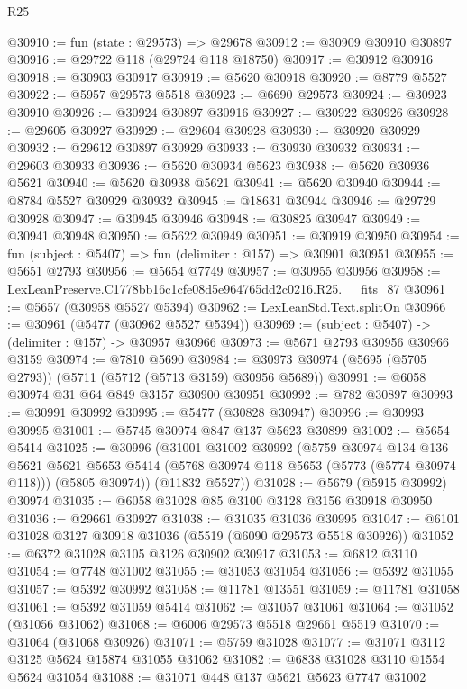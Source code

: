 \begin{lexlean}{R25}
\begin{coremodule}
@30910 := fun (state : @29573) => @29678
@30912 := @30909 @30910 @30897
@30916 := @29722 @118 (@29724 @118 @18750)
@30917 := @30912 @30916
@30918 := @30903 @30917
@30919 := @5620 @30918
@30920 := @8779 @5527
@30922 := @5957 @29573 @5518
@30923 := @6690 @29573
@30924 := @30923 @30910
@30926 := @30924 @30897 @30916
@30927 := @30922 @30926
@30928 := @29605 @30927
@30929 := @29604 @30928
@30930 := @30920 @30929
@30932 := @29612 @30897 @30929
@30933 := @30930 @30932
@30934 := @29603 @30933
@30936 := @5620 @30934 @5623
@30938 := @5620 @30936 @5621
@30940 := @5620 @30938 @5621
@30941 := @5620 @30940
@30944 := @8784 @5527 @30929 @30932
@30945 := @18631 @30944
@30946 := @29729 @30928
@30947 := @30945 @30946
@30948 := @30825 @30947
@30949 := @30941 @30948
@30950 := @5622 @30949
@30951 := @30919 @30950
@30954 := fun (subject : @5407) => fun (delimiter : @157) => @30901 @30951
@30955 := @5651 @2793
@30956 := @5654 @7749
@30957 := @30955 @30956
@30958 := LexLeanPreserve.C1778bb16c1cfe08d5e964765dd2c0216.R25.__fits_87
@30961 := @5657 (@30958 @5527 @5394)
@30962 := LexLeanStd.Text.splitOn
@30966 := @30961 (@5477 (@30962 @5527 @5394))
@30969 := (subject : @5407) -> (delimiter : @157) -> @30957 @30966
@30973 := @5671 @2793 @30956 @30966 @3159
@30974 := @7810 @5690
@30984 := @30973 @30974 (@5695 (@5705 @2793)) (@5711 (@5712 (@5713 @3159) @30956 @5689))
@30991 := @6058 @30974 @31 @64 @849 @3157 @30900 @30951
@30992 := @782 @30897
@30993 := @30991 @30992
@30995 := @5477 (@30828 @30947)
@30996 := @30993 @30995
@31001 := @5745 @30974 @847 @137 @5623 @30899
@31002 := @5654 @5414
@31025 := @30996
    (@31001
      @31002
      @30992
      (@5759
        @30974
        @134
        @136
        @5621
        @5621
        @5653
        @5414
        (@5768 @30974 @118 @5653 (@5773 (@5774 @30974 @118)))
        (@5805 @30974))
      (@11832 @5527))
@31028 := @5679 (@5915 @30992) @30974
@31035 := @6058 @31028 @85 @3100 @3128 @3156 @30918 @30950
@31036 := @29661 @30927
@31038 := @31035 @31036 @30995
@31047 := @6101 @31028 @3127 @30918 @31036 (@5519 (@6090 @29573 @5518 @30926))
@31052 := @6372 @31028 @3105 @3126 @30902 @30917
@31053 := @6812 @3110
@31054 := @7748 @31002
@31055 := @31053 @31054
@31056 := @5392 @31055
@31057 := @5392 @30992
@31058 := @11781 @13551
@31059 := @11781 @31058
@31061 := @5392 @31059 @5414
@31062 := @31057 @31061
@31064 := @31052 (@31056 @31062)
@31068 := @6006 @29573 @5518 @29661 @5519
@31070 := @31064 (@31068 @30926)
@31071 := @5759 @31028
@31077 := @31071 @3112 @3125 @5624 @15874 @31055 @31062
@31082 := @6838 @31028 @3110 @1554 @5624 @31054
@31088 := @31071 @448 @137 @5621 @5623 @7747 @31002

\end{coremodule}
\end{lexlean}
